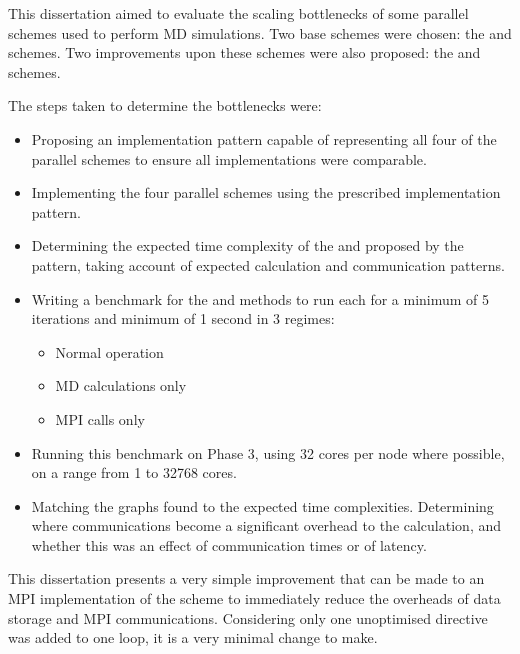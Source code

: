 %
This dissertation aimed to evaluate the scaling bottlenecks of
some parallel schemes used to perform \twobody{} MD simulations.
%
Two base schemes were chosen:
the \replicateddata{} and \systolicloop{} schemes.
Two improvements upon these schemes were also proposed:
the \sharedandreplicateddata{} and \replicatedsystolicloop{} schemes.

The steps taken to determine the bottlenecks were:
\begin{itemize}
\item
    Proposing an implementation pattern capable of representing
    all four of the parallel schemes to ensure all implementations
    were comparable.

\item
    Implementing the four parallel schemes using the prescribed
    implementation pattern.

\item
    Determining the expected time complexity of the
    \individualoperation{} and \pairoperation{} proposed by
    the pattern, taking
    account of expected calculation and communication patterns.

\item
    Writing a benchmark for the
    \individualoperation{} and \pairoperation{} methods
    to run each for a minimum of 5 iterations and minimum of 1 second
    in 3 regimes:
    \begin{itemize}
        \item Normal operation
        \item MD calculations only
        \item MPI calls only
    \end{itemize}

\item
    Running this benchmark on \hector{} Phase 3, using 32 cores per node
    where possible, on a range from 1 to 32768 cores.

\item
    Matching the graphs found to the expected time complexities.
    Determining where communications become a significant overhead
    to the calculation, and whether this was an effect of communication
    times or of latency.
\end{itemize}


This dissertation presents a very simple improvement that can be
made to an MPI implementation of the \replicateddata{} scheme to 
immediately reduce the overheads of data storage and MPI
communications.
%
Considering only one unoptimised \openmp{} directive was added to
one loop, it is a very minimal change to make.

